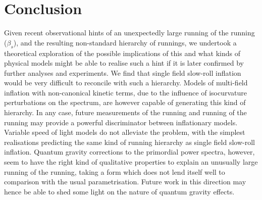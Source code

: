 \documentclass[universe,preprints,oneauthor,pdftex,10pt,a4paper]{mdpi}
\begin{document}
\section{Conclusion}

Given recent observational hints of an unexpectedly large running of the running ($\beta_s$), and the resulting non-standard hierarchy of runnings, we undertook a theoretical exploration of the possible implications of this and what kinds of physical models might be able to realise such a hint if it is later confirmed by further analyses and experiments. We find that single field slow-roll inflation would be very difficult to reconcile with such a hierarchy. Models of multi-field inflation with non-canonical kinetic terms, due to the influence of isocurvature perturbations on the spectrum, are however capable of generating this kind of hierarchy. In any case, future measurements of the running and running of the running may provide a powerful discriminator between inflationary models. Variable speed of light models do not alleviate the problem, with the simplest realisations predicting the same kind of running hierarchy as single field slow-roll inflation. Quantum gravity corrections to the primordial power spectra, however, seem to have the right kind of qualitative properties to explain an unusually large running of the running, taking a form which does not lend itself well to comparison with the usual parametrisation. Future work in this direction may hence be able to shed some light on the nature of quantum gravity effects.

%

\vspace{6pt} 


\end{document}
